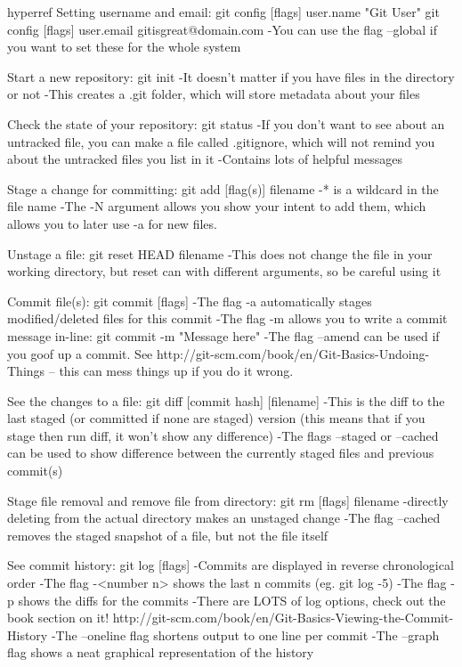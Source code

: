 \documentclass[12pt]{article}
\begin{document}
hyperref
Setting username and email:
git config [flags] user.name "Git User"
git config [flags] user.email gitisgreat@domain.com
-You can use the flag --global if you want to set these for the whole system

Start a new repository:
git init
-It doesn't matter if you have files in the directory or not
-This creates a .git folder, which will store metadata about your files

Check the state of your repository:
git status
-If you don't want to see about an untracked file, you can make a file called
    .gitignore, which will not remind you about the untracked files you list
    in it
-Contains lots of helpful messages

Stage a change for committing:
git add [flag(s)] filename
-* is a wildcard in the file name
-The -N argument allows you show your intent to add them, which allows you to
    later use -a for new files.

Unstage a file:
git reset HEAD filename
-This does not change the file in your working directory, but reset can with
    different arguments, so be careful using it

Commit file(s):
git commit [flags]
-The flag -a automatically stages modified/deleted files for this commit
-The flag -m allows you to write a commit message in-line:
    git commit -m "Message here"
-The flag --amend can be used if you goof up a commit. See
    http://git-scm.com/book/en/Git-Basics-Undoing-Things -- this can mess
    things up if you do it wrong.

See the changes to a file:
git diff [commit hash] [filename]
-This is the diff to the last staged (or committed if none are staged) version
    (this means that if you stage then run diff, it won't show any difference)
-The flags --staged or --cached can be used to show difference between the
    currently staged files and previous commit(s)

Stage file removal and remove file from directory:
git rm [flags] filename
-directly deleting from the actual directory makes an unstaged change
-The flag --cached removes the staged snapshot of a file, but not the file
    itself

See commit history:
git log [flags]
-Commits are displayed in reverse chronological order
-The flag -<number n> shows the last n commits (eg. git log -5)
-The flag -p shows the diffs for the commits
-There are LOTS of log options, check out the book section on it!
    http://git-scm.com/book/en/Git-Basics-Viewing-the-Commit-History
-The --oneline flag shortens output to one line per commit
-The --graph flag shows a neat graphical representation of the history
\end{document}
